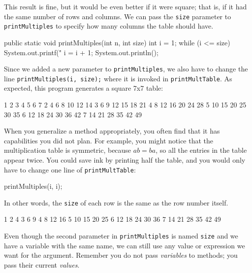 \documentclass[12pt]{book}
\theoremstyle{exercise}
\newcommand{\java}[1]{\verb"#1"}
\newcommand{\java}[1]{\lstinline{#1}} %
\begin{document}
This result is fine, but it would be even better if it were square; that is, if it had the same number of rows and columns.
We can pass the \java{size} parameter to \java{printMultiples} to specify how many columns the table should have.

\begin{code}
    public static void printMultiples(int n, int size) {
        int i = 1;
        while (i <= size) {
            System.out.printf("%
            i = i + 1;
        }
        System.out.println();
    }
\end{code}


Since we added a new parameter to \java{printMultiples}, we also have to change the line \java{printMultiples(i, size);} where it is invoked in \java{printMultTable}.
As expected, this program generates a square 7x7 table:

\begin{stdout}
   1   2   3   4   5   6   7
   2   4   6   8  10  12  14
   3   6   9  12  15  18  21
   4   8  12  16  20  24  28
   5  10  15  20  25  30  35
   6  12  18  24  30  36  42
   7  14  21  28  35  42  49
\end{stdout}

When you generalize a method appropriately, you often find that it has capabilities you did not plan.
For example, you might notice that the multiplication table is symmetric, because $ab = ba$, so all the entries in the table appear twice.
You could save ink by printing half the table, and you would only have to change one line of \java{printMultTable}:

\begin{code}
      printMultiples(i, i);
\end{code}

In other words, the \java{size} of each row is the same as the row number itself.

\begin{stdout}
   1
   2   4
   3   6   9
   4   8  12  16
   5  10  15  20  25
   6  12  18  24  30  36
   7  14  21  28  35  42  49
\end{stdout}

Even though the second parameter in \java{printMultiples} is named \java{size} and we have a variable with the same name, we can still use any value or expression we want for the argument.
Remember you do not pass {\em variables} to methods; you pass their current {\em values}.
\end{document}
